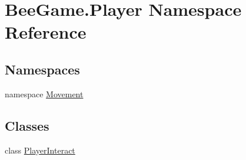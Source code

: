 \hypertarget{namespace_bee_game_1_1_player}{}\section{Bee\+Game.\+Player Namespace Reference}
\label{namespace_bee_game_1_1_player}
\subsection*{Namespaces}
\begin{DoxyCompactItemize}
\item 
namespace \hyperlink{namespace_bee_game_1_1_player_1_1_movement}{Movement}
\end{DoxyCompactItemize}
\subsection*{Classes}
\begin{DoxyCompactItemize}
\item 
class \hyperlink{class_bee_game_1_1_player_1_1_player_interact}{Player\+Interact}
\end{DoxyCompactItemize}
